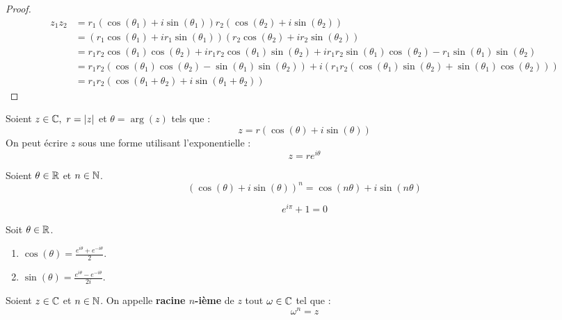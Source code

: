 \begin{proof}
	\begin{align*}
		z_1 z_2 &= r_1(\cos(\theta_1) + i \sin(\theta_1)) r_2(\cos(\theta_2) + i \sin(\theta_2)) \\
		&= (r_1 \cos(\theta_1) + i r_1 \sin(\theta_1))(r_2 \cos(\theta_2) + i r_2 \sin(\theta_2)) \\
		&= r_1 r_2 \cos(\theta_1) \cos(\theta_2) + i r_1 r_2 \cos(\theta_1) \sin(\theta_2) + i r_1 r_2 \sin(\theta_1) \cos(\theta_2) - r_1 \sin(\theta_1) \sin(\theta_2) \\
		&= r_1 r_2 (\cos(\theta_1) \cos(\theta_2) - \sin(\theta_1) \sin(\theta_2)) + i (r_1 r_2(\cos(\theta_1) \sin(\theta_2) + \sin(\theta_1)\cos(\theta_2))) \\
		&= r_1 r_2 (\cos(\theta_1 + \theta_2) + i \sin(\theta_1 + \theta_2))
	\end{align*}
\end{proof}

\begin{definition}
	Soient $z \in \mathbb{C},\ r = \abs{z}$ et $\theta = \arg(z)$ tels que :
	\[ z = r (\cos(\theta) + i \sin(\theta)) \]
	On peut écrire $z$ sous une forme utilisant l'exponentielle :
	\[ z = re^{i \theta} \]
\end{definition}

\begin{proposition}
	Soient $\theta \in \mathbb{R}$ et $n \in \mathbb{N}$.
	\[ (\cos(\theta) + i \sin(\theta))^n = \cos(n \theta) + i \sin(n \theta) \]
\end{proposition}

\begin{proposition}
	\[ e^{i\pi} + 1 = 0 \]
\end{proposition}

\begin{proposition}
	Soit $\theta \in \mathbb{R}$.
	\begin{enumerate}
			\item $\cos(\theta) = \frac{e^{i\theta} + e^{-i\theta}}{2}$.
			\item $\sin(\theta) = \frac{e^{i\theta} - e^{-i\theta}}{2i}$.
		\end{enumerate}
\end{proposition}

\begin{definition}
	Soient $z \in \mathbb{C}$ et $n \in \mathbb{N}$. On appelle \textbf{racine $n$-ième} de $z$ tout $\omega \in \mathbb{C}$ tel que :
	\[ \omega^n = z \] 
\end{definition}

